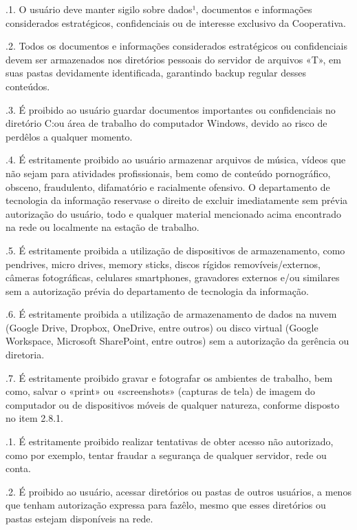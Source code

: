\documentclass[a4paper,10pt,portuges]{sphinxmanual}
\begin{document}
.1. O usuário deve manter sigilo sobre dados¹, documentos e informações considerados estratégicos, confidenciais ou de interesse exclusivo da Cooperativa.

.2. Todos os documentos e informações considerados estratégicos ou confidenciais devem ser armazenados nos diretórios pessoais do servidor de arquivos «T», em suas pastas devidamente identificada, garantindo backup regular desses conteúdos.

.3. É proibido ao usuário guardar documentos importantes ou confidenciais no diretório C:ou área de trabalho do computador Windows, devido ao risco de perdê\sphinxhyphen{}los a qualquer momento.

.4. É estritamente proibido ao usuário armazenar arquivos de música, vídeos que não sejam para atividades profissionais, bem como de conteúdo pornográfico, obsceno, fraudulento, difamatório e racialmente ofensivo. O departamento de tecnologia da informação reserva\sphinxhyphen{}se o direito de excluir imediatamente sem prévia autorização do usuário, todo e qualquer material mencionado acima encontrado na rede ou localmente na estação de trabalho.

.5. É estritamente proibida a utilização de dispositivos de armazenamento, como pendrives, micro drives, memory sticks, discos rígidos removíveis/externos, câmeras fotográficas, celulares smartphones, gravadores externos e/ou similares sem a autorização prévia do departamento de tecnologia da informação.

.6. É estritamente proibida a utilização de armazenamento de dados na nuvem (Google Drive, Dropbox, OneDrive, entre outros) ou disco virtual (Google Workspace, Microsoft SharePoint, entre outros) sem a autorização da gerência ou diretoria.

.7. É estritamente proibido gravar e fotografar os ambientes de trabalho, bem como, salvar o «print» ou «screenshots» (capturas de tela) de imagem do computador ou de dispositivos móveis de qualquer natureza, conforme disposto no item 2.8.1.

.1. É estritamente proibido realizar tentativas de obter acesso não autorizado, como por exemplo, tentar fraudar a segurança de qualquer servidor, rede ou conta.

.2. É proibido ao usuário, acessar diretórios ou pastas de outros usuários, a menos que tenham autorização expressa para fazê\sphinxhyphen{}lo, mesmo que esses diretórios ou pastas estejam disponíveis na rede.
\end{document}
